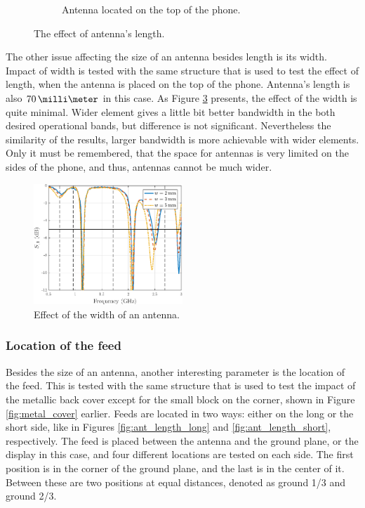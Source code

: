 \begin{figure}[H]
\begin{subfigure}[b]{0.49\textwidth}
        \caption{Antenna located on the top of the phone.}
        \label{fig:ant_length_short_res}
    \end{subfigure}
    \caption{The effect of antenna's length.}
    \label{fig:ant_length_result}
\end{figure}

The other issue affecting the size of an antenna besides length is its width. Impact of width is tested with the same structure that is used to test the effect of length, when the antenna is placed on the top of the phone. Antenna's length is also $70\,\milli\meter$ in this case. As Figure \ref{fig:width_res} presents, the effect of the width is quite minimal. Wider element gives a little bit better bandwidth in the both desired operational bands, but difference is not significant. Nevertheless the similarity of the results, larger bandwidth is more achievable with wider elements. Only it must be remembered, that the space for antennas is very limited on the sides of the phone, and thus, antennas cannot be much wider.

\begin{figure}[H]
    \centering
    \includegraphics[width=0.5\textwidth]{img/width_res.eps}
    \caption{Effect of the width of an antenna.}
    \label{fig:width_res}
\end{figure}


\subsubsection{Location of the feed}
\label{sec:feed}
Besides the size of an antenna, another interesting parameter is the location of the feed. This is tested with the same structure that is used to test the impact of the metallic back cover except for the small block on the corner, shown in Figure \ref{fig:metal_cover} earlier. Feeds are located in two ways: either on the long or the short side, like in Figures \ref{fig:ant_length_long} and \ref{fig:ant_length_short}, respectively. The feed is placed between the antenna and the ground plane, or the display in this case, and four different locations are tested on each side. The first position is in the corner of the ground plane, and the last is in the center of it. Between these are two positions at equal distances, denoted as ground 1/3 and ground 2/3.

